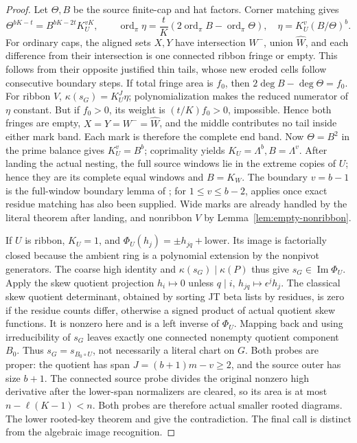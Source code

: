 \documentclass[11pt,a4paper]{amsart}
\numberwithin{equation}{section}
\theoremstyle{plain}
\theoremstyle{definition}
\begin{document}
\begin{proof}
Let \(\Theta,B\) be the source finite-cap and hat factors.  Corner matching gives
\[
 \Theta^{bK-t}=B^{bK-2t}K_U^{vK},\qquad
 \operatorname{ord}_\pi\eta=\frac tK(2\operatorname{ord}_\pi B-\operatorname{ord}_\pi\Theta),\quad
 \eta=K_U^v(B/\Theta)^b.
\]
For ordinary caps, the aligned sets \(X,Y\) have intersection \(W^-\), union \(\widehat W\), and each difference from their intersection is one connected ribbon fringe or empty.  This follows from their opposite justified thin tails, whose new eroded cells follow consecutive boundary steps.  If total fringe area is \(f_0\), then \(2\deg B-\deg\Theta=f_0\).  For ribbon \(V\), \(\kappa(s_G)=K_U^J\eta\); polynomialization makes the reduced numerator of \(\eta\) constant.  But if \(f_0>0\), its weight is \((t/K)f_0>0\), impossible.  Hence both fringes are empty, \(X=Y=W^-=\widehat W\), and the middle contributes no tail inside either mark band.  Each mark is therefore the complete end band.  Now \(\Theta=B^2\) in the prime balance gives \(K_U^v=B^b\); coprimality yields \(K_U=\Lambda^b,B=\Lambda^v\).  After landing the actual nesting, the full source windows lie in the extreme copies of \(U\); hence they are its complete equal windows and \(B=K_W\).  The boundary \(v=b-1\) is the full-window boundary lemma of \cite{Shields2026CornerDescent}; for \(1\le v\le b-2\),  applies once exact residue matching has also been supplied.  Wide marks are already handled by the literal theorem after landing, and nonribbon \(V\) by Lemma~\ref{lem:empty-nonribbon}.

If \(U\) is ribbon, \(K_U=1\), and \(\Phi_U(h_j)=\pm h_{jq}+\text{lower}\).  Its image is factorially closed because the ambient ring is a polynomial extension by the nonpivot generators.  The coarse high identity and \(\kappa(s_G)\mid\kappa(P)\) thus give \(s_G\in\operatorname{Im}\Phi_U\).  Apply the skew quotient projection \(h_i\mapsto0\) unless \(q\mid i\), \(h_{jq}\mapsto\epsilon^jh_j\).  The classical skew quotient determinant, obtained by sorting JT beta lists by residues, is zero if the residue counts differ, otherwise a signed product of actual quotient skew functions.  It is nonzero here and is a left inverse of \(\Phi_U\).  Mapping back and using irreducibility of \(s_G\) leaves exactly one connected nonempty quotient component \(B_0\).  Thus \(s_G=s_{B_0\circ U}\), not necessarily a literal chart on \(G\).  Both probes are proper: the quotient has span \(J=(b+1)m-v\ge2\), and the source outer has size \(b+1\).  The connected source probe divides the original nonzero high derivative after the lower-span normalizers are cleared, so its area is at most \(n-\ell(K-1)<n\).  Both probes are therefore actual smaller rooted diagrams.  The lower rooted-key theorem and  give the contradiction.  The final call is distinct from the algebraic image recognition.
\end{proof}
\end{document}
